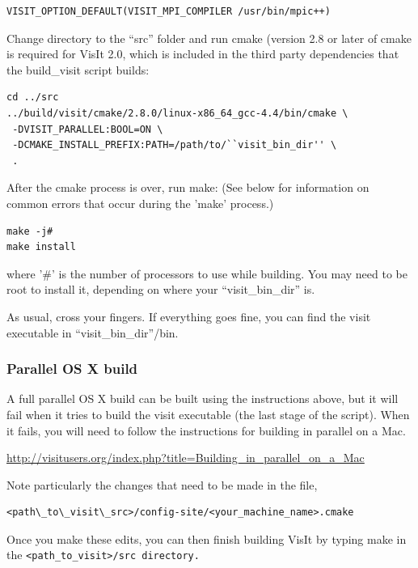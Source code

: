 \documentclass[12pt]{article}
\begin{document}
\begin{verbatim}
VISIT_OPTION_DEFAULT(VISIT_MPI_COMPILER /usr/bin/mpic++)
\end{verbatim}

Change directory to the ``src'' folder and run cmake (version 2.8 or
later of cmake is required for VisIt 2.0, which is included in the 
third party dependencies that the build\_visit script builds:

\begin{verbatim}
cd ../src
../build/visit/cmake/2.8.0/linux-x86_64_gcc-4.4/bin/cmake \
 -DVISIT_PARALLEL:BOOL=ON \
 -DCMAKE_INSTALL_PREFIX:PATH=/path/to/``visit_bin_dir'' \
 .
\end{verbatim}


After the cmake process is over, run make:  (See below for
information on common errors that occur during the 'make' process.)

\begin{verbatim}
make -j#
make install
\end{verbatim}

where '\#' is the number of processors to use while building.  You
may need to be root to install it, depending on where your
``visit\_bin\_dir'' is.

As usual, cross your fingers. If everything goes fine, you can find
the visit executable in ``visit\_bin\_dir''/bin.


\subsubsection{Parallel OS X build}
\label{sec:ParallelOSXBuild}

A full parallel OS X build can be built using the instructions above,
but it will fail when it tries to build the visit executable (the last
stage of the script). When it fails, you will need to follow the
instructions for building in parallel on a Mac.

\url{http://visitusers.org/index.php?title=Building_in_parallel_on_a_Mac}

  
Note particularly the changes that need to be made in the file, 

\begin{verbatim}
<path\_to\_visit\_src>/config-site/<your_machine_name>.cmake
\end{verbatim}

\normalfont Once you make these edits, you can then finish building VisIt by typing make in the \tt <path\_to\_visit>/src \normalfont directory.  
\end{document}
